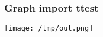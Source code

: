 \documentclass{beamer}
\begin{document}
\begin{frame}
  \frametitle{Graph import ttest}
  \texttt{[image: /tmp/out.png]}
\end{frame}
\end{document}

